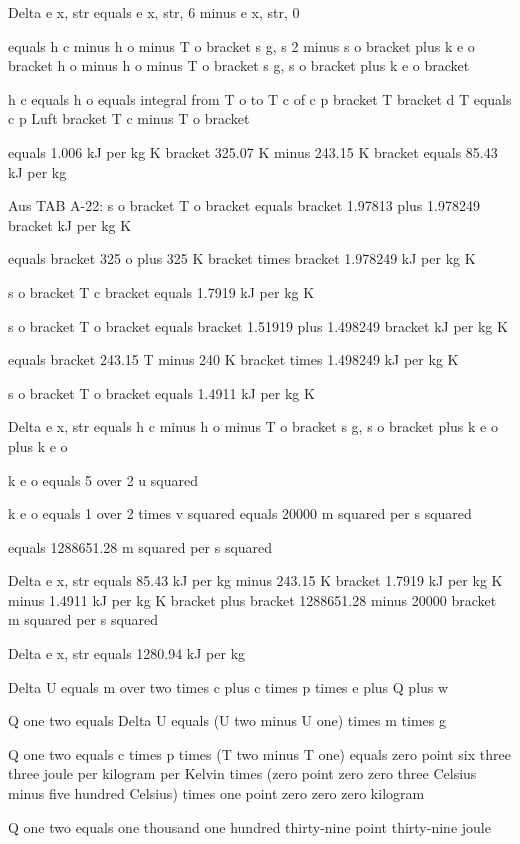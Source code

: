 Delta e x, str equals e x, str, 6 minus e x, str, 0

equals h c minus h o minus T o bracket s g, s 2 minus s o bracket plus k e o bracket h o minus h o minus T o bracket s g, s o bracket plus k e o bracket

h c equals h o equals integral from T o to T c of c p bracket T bracket d T equals c p Luft bracket T c minus T o bracket

equals 1.006 kJ per kg K bracket 325.07 K minus 243.15 K bracket equals 85.43 kJ per kg

Aus TAB A-22: s o bracket T o bracket equals bracket 1.97813 plus 1.978249 bracket kJ per kg K

equals bracket 325 o plus 325 K bracket times bracket 1.978249 kJ per kg K

s o bracket T c bracket equals 1.7919 kJ per kg K

s o bracket T o bracket equals bracket 1.51919 plus 1.498249 bracket kJ per kg K

equals bracket 243.15 T minus 240 K bracket times 1.498249 kJ per kg K

s o bracket T o bracket equals 1.4911 kJ per kg K

Delta e x, str equals h c minus h o minus T o bracket s g, s o bracket plus k e o plus k e o

k e o equals 5 over 2 u squared

k e o equals 1 over 2 times v squared equals 20000 m squared per s squared

equals 1288651.28 m squared per s squared

Delta e x, str equals 85.43 kJ per kg minus 243.15 K bracket 1.7919 kJ per kg K minus 1.4911 kJ per kg K bracket plus bracket 1288651.28 minus 20000 bracket m squared per s squared

Delta e x, str equals 1280.94 kJ per kg

Delta U equals m over two times c plus c times p times e plus Q plus w  

Q one two equals Delta U equals (U two minus U one) times m times g  

Q one two equals c times p times (T two minus T one) equals zero point six three three joule per kilogram per Kelvin times (zero point zero zero three Celsius minus five hundred Celsius) times one point zero zero zero kilogram  

Q one two equals one thousand one hundred thirty-nine point thirty-nine joule